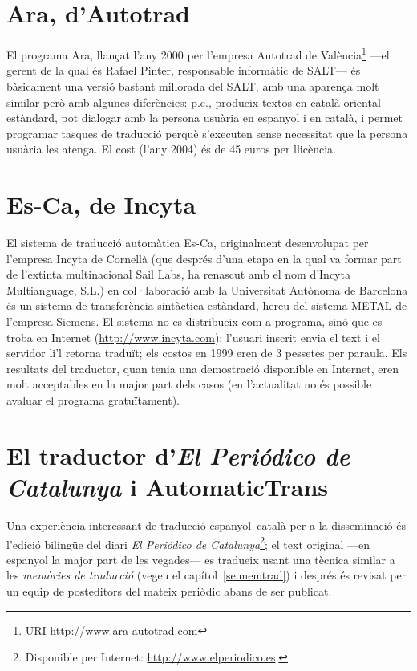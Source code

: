 \section{Ara, d'Autotrad}

El programa Ara, llançat l'any 2000 per l'empresa Autotrad de
València\footnote{URI \url{http://www.ara-autotrad.com}} ---el
gerent de la qual és Rafael Pinter, responsable informàtic de SALT---
és bàsicament una versió bastant millorada del SALT, amb una aparença
molt similar però amb algunes diferències: p.e., produeix textos en
català oriental estàndard, pot dialogar amb la persona usuària en
espanyol i en català, i permet programar tasques de traducció perquè
s'executen sense necessitat que la persona usuària les atenga. El cost
(l'any 2004) és de 45 euros per llicència.

\section{Es-Ca, de Incyta}

El sistema de traducció automàtica Es-Ca, originalment desenvolupat
per l'empresa Incyta de Cornellà (que després d'una etapa en la qual
va formar part de l'extinta multinacional Sail Labs, ha renascut amb
el nom d'Incyta Multianguage, S.L.) en col·laboració amb la
Universitat Autònoma de Barcelona és un sistema de transferència
sintàctica estàndard, hereu del sistema METAL de l'empresa Siemens. El
sistema no es distribueix com a programa, sinó que es troba en
Internet (\url{http://www.incyta.com}): l'usuari inscrit envia el
text i el servidor li'l retorna traduït; els costos en 1999 eren de 3
pessetes per paraula.  Els resultats del traductor, quan tenia una
demostració disponible en Internet, eren molt acceptables en la major
part dels casos (en l'actualitat no és possible avaluar el programa
gratuïtament).

\section{El traductor d'\emph{El Periódico de Catalunya} i AutomaticTrans}
\label{ss:ePdC}

Una experiència interessant de traducció espanyol--català per a la
disseminació és l'edició bilingüe del diari \emph{El Periódico de
  Catalunya}\footnote{Disponible per Internet:
  \url{http://www.elperiodico.es}.}; el text original ---en
espanyol la major part de les vegades--- es tradueix usant una tècnica
similar a les \emph{memòries de traducció} (vegeu el
capítol~\ref{se:memtrad}) i després és revisat per un equip de
posteditors del mateix periòdic abans de ser publicat.

